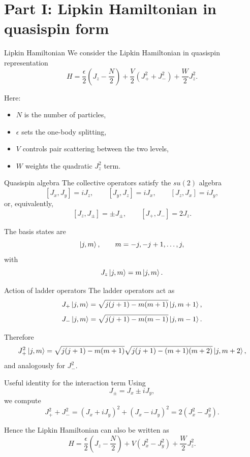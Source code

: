 \documentclass[aspectratio=169]{beamer}
\begin{document}
\section{Part I: Lipkin Hamiltonian in quasispin form}

\begin{frame}{Lipkin Hamiltonian}
We consider the Lipkin Hamiltonian in quasispin representation
\[
H
=
\frac{\epsilon}{2}\left(J_z-\frac{N}{2}\right)
+
\frac{V}{2}\left(J_+^2+J_-^2\right)
+
\frac{W}{2}J_z^2.
\]

Here:
\begin{itemize}
\item \(N\) is the number of particles,
\item \(\epsilon\) sets the one-body splitting,
\item \(V\) controls pair scattering between the two levels,
\item \(W\) weights the quadratic \(J_z^2\) term.
\end{itemize}
\end{frame}

\begin{frame}{Quasispin algebra}
The collective operators satisfy the \(su(2)\) algebra
\[
[J_x,J_y]=iJ_z,\qquad
[J_y,J_z]=iJ_x,\qquad
[J_z,J_x]=iJ_y,
\]
or, equivalently,
\[
[J_z,J_\pm]=\pm J_\pm,
\qquad
[J_+,J_-]=2J_z.
\]

The basis states are
\[
\ket{j,m},
\qquad
m=-j,-j+1,\dots,j,
\]
with
\[
J_z\ket{j,m}=m\ket{j,m}.
\]
\end{frame}

\begin{frame}{Action of ladder operators}
The ladder operators act as
\[
J_+\ket{j,m}
=
\sqrt{j(j+1)-m(m+1)}\ket{j,m+1},
\]
\[
J_-\ket{j,m}
=
\sqrt{j(j+1)-m(m-1)}\ket{j,m-1}.
\]

Therefore
\[
J_+^2\ket{j,m}
=
\sqrt{j(j+1)-m(m+1)}
\sqrt{j(j+1)-(m+1)(m+2)}
\ket{j,m+2},
\]
and analogously for \(J_-^2\).
\end{frame}

\begin{frame}{Useful identity for the interaction term}
Using
\[
J_\pm = J_x \pm iJ_y,
\]
we compute
\[
J_+^2 + J_-^2
=
(J_x+iJ_y)^2 + (J_x-iJ_y)^2
=
2(J_x^2-J_y^2).
\]

Hence the Lipkin Hamiltonian can also be written as
\[
H
=
\frac{\epsilon}{2}\left(J_z-\frac{N}{2}\right)
+
V(J_x^2-J_y^2)
+
\frac{W}{2}J_z^2.
\]
\end{frame}
\end{document}
